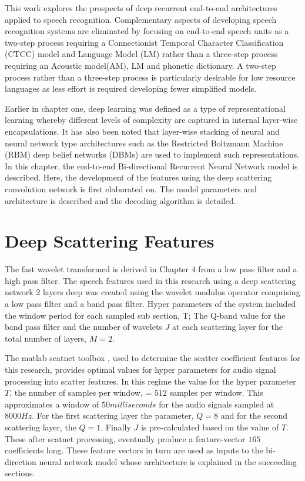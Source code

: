 This work explores the prospects of deep recurrent end-to-end architectures applied to speech recognition. Complementary aspects of developing speech recognition systems are eliminated by focusing on end-to-end speech units as a two-step process requiring a Connectionist Temporal Character Classification (CTCC)\cite{graves2006connectionist} model and Language Model (LM) rather than a three-step process requiring an Acoustic model(AM), LM and phonetic dictionary. A two-step process rather than a three-step process is particularly desirable for low resource languages as less effort is required developing fewer simplified models.

Earlier in chapter one, deep learning was defined as a type of representational learning whereby different levels of complexity are captured in internal layer-wise encapsulations. It has also been noted that layer-wise stacking of neural and neural network type architectures such as the Restricted Boltzmann Machine (RBM) deep belief networks (DBMs) are used to implement such representations. In this chapter, the end-to-end Bi-directional Recurrent Neural Network model is described. Here, the development of the features using the deep scattering convolution network is first elaborated on. The model parameters and architecture is described and the decoding algorithm is detailed.

\section{Deep Scattering Features}
The fast wavelet transformed is derived in Chapter 4 from a low pass filter and a high pass filter.  The speech features used in this research using a deep scattering network 2 layers deep was created using the wavelet modulus operator comprising a low pass filter and a band pass filter.   Hyper parameters of the system included the window period for each sampled sub section, T;  The Q-band value for the band pass filter and the number of wavelets $J$ at each scattering layer for the total number of layers, $M=2$.

The matlab scatnet toolbox \citep{anden2014scatnet}, used to determine the scatter coefficient features for this research, provides optimal values for hyper parameters for audio signal processing into scatter features.  In this regime the value for the hyper parameter $T$, the number of samples per window, = $512$ samples per window. This approximates a window of $50 milliseconds$ for the audio signals sampled at $8000 Hz$.  For the first scattering layer the parameter, $Q=8$ and for the second scattering layer, the $Q=1$.  Finally $J$ is pre-calculated based on the value of $T$.  These after scatnet processing, eventually produce a feature-vector $165$ coefficients long.  These feature vectors in turn are used as inputs to the bi-direction neural network model whose architecture is explained in the succeeding sections.

